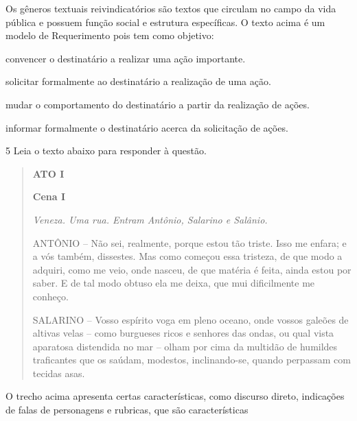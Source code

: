 
Os gêneros textuais reivindicatórios são textos que circulam no campo da
vida pública e possuem função social e estrutura específicas. O texto
acima é um modelo de Requerimento pois tem como objetivo:

\begin{escolha} 

\item convencer o destinatário a realizar uma ação importante.

\item solicitar formalmente ao destinatário a realização de uma ação.

\item mudar o comportamento do destinatário a partir da realização de ações.

\item informar formalmente o destinatário acerca da solicitação de ações.

\end{escolha}

\num{5} Leia o texto abaixo para responder à questão.

\begin{quote}
\textbf{ATO I}

\textbf{Cena I}

\textit{Veneza. Uma rua. Entram Antônio, Salarino e Salânio.}

ANTÔNIO -- Não sei, realmente, porque estou tão triste. Isso me enfara; e
a vós também, dissestes. Mas como começou essa tristeza, de que modo a
adquiri, como me veio, onde nasceu, de que matéria é feita, ainda estou
por saber. E de tal modo obtuso ela me deixa, que mui dificilmente me
conheço.

SALARINO -- Vosso espírito voga em pleno oceano, onde vossos galeões de
altivas velas -- como burgueses ricos e senhores das ondas, ou qual vista
aparatosa distendida no mar -- olham por cima da multidão de humildes
traficantes que os saúdam, modestos, inclinando-se, quando perpassam com
tecidas asas.

\end{quote}


O trecho acima apresenta certas características, como discurso direto,
indicações de falas de personagens e rubricas, que são características 


